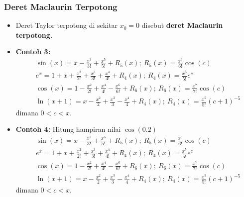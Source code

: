 \documentclass[pdflatex,compress]{beamer}
\begin{document}
\begin{frame}
	\frametitle{Deret Maclaurin Terpotong}
	\begin{itemize}
		\item Deret Taylor terpotong di sekitar $ x_0 = 0 $ disebut \textbf{deret Maclaurin terpotong.}
		\item \textbf{Contoh 3:}
		\begin{align*}
			&\sin(x) = x - \frac{x^3}{3!} + \frac{x^5}{5!} + R_5(x);~ R_5(x) = \frac{x^6}{6!}\cos(c) \\
			&e^x = 1 + x + \frac{x^2}{2!} + \frac{x^3}{3!} + \frac{x^4}{4!} + R_4(x);~R_4(x) = \frac{x^5}{5!}e^c \\
			&\cos(x) = 1 - \frac{x^2}{2!} + \frac{x^4}{4!} - \frac{x^6}{6!} + R_6(x);~R_6(x) = \frac{x^7}{7!}\cos(c) \\
			&\ln(x+1) = x - \frac{x^2}{2} + \frac{x^3}{3} - \frac{x^4}{4} + R_4(x);~R_4(x) = \frac{x^5}{5!}(c+1)^{-5}
		\end{align*}
		dimana $ 0 < c < x $.
	\end{itemize}
\end{frame}

\begin{frame}
	\begin{itemize}
		\item \textbf{Contoh 4:} Hitung hampiran nilai $ \cos(0.2) $
		\begin{align*}
		&\sin(x) = x - \frac{x^3}{3!} + \frac{x^5}{5!} + R_5(x);~ R_5(x) = \frac{x^6}{6!}\cos(c) \\
		&e^x = 1 + x + \frac{x^2}{2!} + \frac{x^3}{3!} + \frac{x^4}{4!} + R_4(x);~R_4(x) = \frac{x^5}{5!}e^c \\
		&\cos(x) = 1 - \frac{x^2}{2!} + \frac{x^4}{4!} - \frac{x^6}{6!} + R_6(x);~R_6(x) = \frac{x^7}{7!}\cos(c) \\
		&\ln(x+1) = x - \frac{x^2}{2} + \frac{x^3}{3} - \frac{x^4}{4} + R_4(x);~R_4(x) = \frac{x^5}{5!}(c+1)^{-5}
		\end{align*}
		dimana $ 0 < c < x $.
	\end{itemize}
\end{frame}
	
\end{document}
